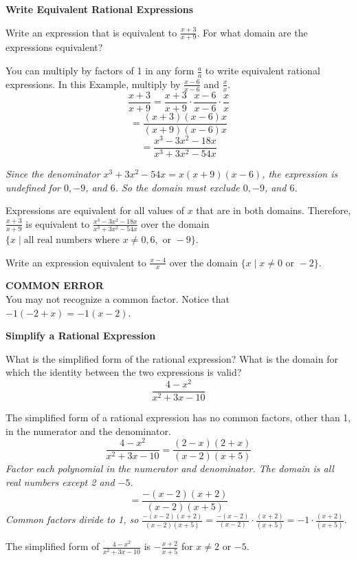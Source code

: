 \documentclass{article}
\newenvironment{concept-box}{}{}
\newenvironment{example}[1]{}{}
\newenvironment{tryit}[1]{}{}
\begin{document}
\begin{example}{1}
\textbf{Write Equivalent Rational Expressions}

Write an expression that is equivalent to $\frac{x + 3}{x + 9}$. For what domain are the expressions equivalent?

You can multiply by factors of 1 in any form $\frac{a}{a}$ to write equivalent rational expressions. In this Example, multiply by $\frac{x - 6}{x - 6}$ and $\frac{x}{x}$.
$$ \frac{x + 3}{x + 9} = \frac{x + 3}{x + 9} \cdot \frac{x - 6}{x - 6} \cdot \frac{x}{x} $$
$$ = \frac{(x + 3)(x - 6)x}{(x + 9)(x - 6)x} $$
$$ = \frac{x^3 - 3x^2 - 18x}{x^3 + 3x^2 - 54x} $$

\emph{Since the denominator $x^3 + 3x^2 - 54x = x(x + 9)(x - 6)$, the expression is undefined for $0, -9$, and $6$. So the domain must exclude $0, -9$, and $6$.}

Expressions are equivalent for all values of $x$ that are in both domains. Therefore, $\frac{x + 3}{x + 9}$ is equivalent to $\frac{x^3 - 3x^2 - 18x}{x^3 + 3x^2 - 54x}$ over the domain $\{ x \mid \text{all real numbers where } x \neq 0, 6, \text{ or } -9 \}$.
\end{example}

\begin{tryit}{1}
Write an expression equivalent to $\frac{x - 4}{x}$ over the domain $\{ x \mid x \neq 0 \text{ or } -2 \}$.
\end{tryit}

\begin{concept-box}
\textbf{COMMON ERROR} \\
You may not recognize a common factor. Notice that $-1(-2 + x) = -1(x - 2)$.
\end{concept-box}

\begin{example}{2}
\textbf{Simplify a Rational Expression}

What is the simplified form of the rational expression? What is the domain for which the identity between the two expressions is valid?
$$ \frac{4 - x^2}{x^2 + 3x - 10} $$

The simplified form of a rational expression has no common factors, other than 1, in the numerator and the denominator.
$$ \frac{4 - x^2}{x^2 + 3x - 10} = \frac{(2 - x)(2 + x)}{(x - 2)(x + 5)} $$
\emph{Factor each polynomial in the numerator and denominator. The domain is all real numbers except 2 and $-5$.}
$$ = \frac{-(x - 2)(x + 2)}{(x - 2)(x + 5)} $$
\emph{Common factors divide to 1, so $\frac{-(x - 2)(x + 2)}{(x - 2)(x + 5)} = \frac{-(x - 2)}{(x - 2)} \cdot \frac{(x + 2)}{(x + 5)} = -1 \cdot \frac{(x + 2)}{(x + 5)}$.}

The simplified form of $\frac{4 - x^2}{x^2 + 3x - 10}$ is $-\frac{x + 2}{x + 5}$ for $x \neq 2$ or $-5$.
\end{example}
\end{document}
